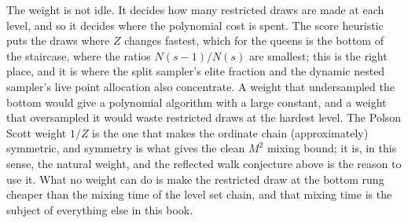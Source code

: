The weight is not idle. It decides how many restricted draws are made at each level, and so it decides where the polynomial cost is spent. The score heuristic puts the draws where $Z$ changes fastest, which for the queens is the bottom of the staircase, where the ratios $N(s-1)/N(s)$ are smallest; this is the right place, and it is where the split sampler's elite fraction and the dynamic nested sampler's live point allocation also concentrate. A weight that undersampled the bottom would give a polynomial algorithm with a large constant, and a weight that oversampled it would waste restricted draws at the hardest level. The Polson Scott weight $1/Z$ is the one that makes the ordinate chain (approximately) symmetric, and symmetry is what gives the clean $M^2$ mixing bound; it is, in this sense, the natural weight, and the reflected walk conjecture above is the reason to use it. What no weight can do is make the restricted draw at the bottom rung cheaper than the mixing time of the level set chain, and that mixing time is the subject of everything else in this book.
